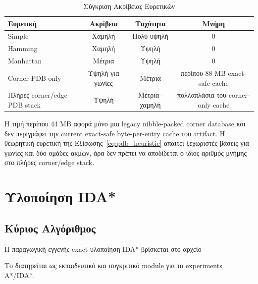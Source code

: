 \begin{table}[htbp]
\centering
\footnotesize
\caption{Σύγκριση Ακρίβειας Ευρετικών}
\label{tab:heuristic_comparison}
\begin{tabularx}{\textwidth}{>{\RaggedRight\arraybackslash}p{3.0cm}ccc}
\toprule
\textbf{Ευρετική} & \textbf{Ακρίβεια} & \textbf{Ταχύτητα} & \textbf{Μνήμη} \\
\midrule
Simple & Χαμηλή & Πολύ υψηλή & 0 \\
Hamming & Χαμηλή & Υψηλή & 0 \\
Manhattan & Μέτρια & Υψηλή & 0 \\
Corner PDB only & Υψηλή για γωνίες & Μέτρια & περίπου 88 MB exact-safe cache \\
Πλήρες corner/edge PDB stack & Υψηλή & Μέτρια--χαμηλή & πολλαπλάσια του corner-only cache \\
\bottomrule
\end{tabularx}
\end{table}

Η τιμή περίπου 44 MB αφορά μόνο μια legacy nibble-packed corner database και
δεν περιγράφει την current exact-safe byte-per-entry cache του artifact. Η
θεωρητική ευρετική της Εξίσωσης~\ref{eq:pdb_heuristic} απαιτεί ξεχωριστές βάσεις
για γωνίες και δύο ομάδες ακμών, άρα δεν πρέπει να αποδίδεται ο ίδιος αριθμός
μνήμης στο πλήρες corner/edge stack.

\section{Υλοποίηση IDA*}

\subsection{Κύριος Αλγόριθμος}

Η παραγωγική εγγενής exact υλοποίηση IDA* βρίσκεται στο αρχείο
\begin{center}
\end{center}
Το  διατηρείται ως εκπαιδευτικό και συγκριτικό
module για τα experiments A*/IDA*.

